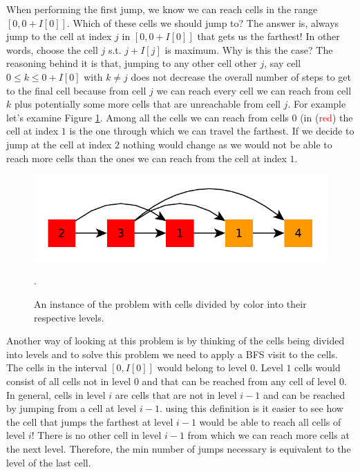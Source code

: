 When performing the first jump, we know we can reach cells in the range $[0,0+I[0]]$. Which of these cells we should jump to?
The answer is, always jump to the cell at index $j$ in $[0,0+I[0]]$ that gets us the farthest! In other words, choose the cell $j$ s.t. $j+I[j]$ is maximum.
Why is this the case? 
The reasoning behind it is that, jumping to any other cell other $j$, say cell $0 \leq k \leq 0+I[0]$ with $k \neq j$ does not decrease the overall number of steps to get to the final cell because from cell $j$ we can reach every cell we can reach from cell $k$ plus potentially some more cells that are unreachable from cell $j$.
For example let's examine Figure \ref{fig:can_jump:can_jump2_example1}. Among all the cells we can reach from cells $0$ (in (\textcolor{red}{red}) the cell at index $1$ is the one through which we can travel the farthest. If we decide to jump at the cell at index $2$ nothing would change as we would not be able to reach more cells than the ones we can reach from the cell at index $1$.

\begin{figure}
    \centering
    \includegraphics[width=\textwidth]{sources/can_jump/images/can_jump2_example1}
    \caption[]{An instance of the problem with cells divided by color into their respective levels.}.
    \label{fig:can_jump:can_jump2_example1}
\end{figure}

Another way of looking at this problem is by thinking of the cells being divided into levels and to solve this problem we need to apply a BFS visit to the cells. 
The cells in the interval $[0,I[0]]$ would belong to level $0$. Level $1$ cells would consist of all cells not in level $0$ and that can be reached from any cell of level $0$. 
In general, cells in level $i$ are cells that are not in level $i-1$ and can be reached by jumping from a cell at level $i-1$.
using this definition is it easier to see how the cell that jumps the farthest at level $i-1$ would be able to reach all cells of level $i$! There is no other cell in level $i-1$ from which we can reach more cells at the next level.
Therefore, the min number of jumps necessary is equivalent to the level of the last cell.



